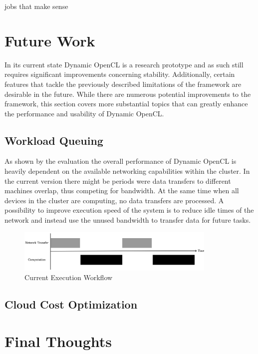 jobs that make sense


\section{Future Work}

In its current state Dynamic OpenCL is a research prototype and as such still requires significant improvements concerning stability. Additionally, certain features that tackle the previously described limitations of the framework are desirable in the future. While there are numerous potential improvements to the framework, this section covers more substantial topics that can greatly enhance the performance and usability of Dynamic OpenCL.

\subsection{Workload Queuing}

As shown by the evaluation the overall performance of Dynamic OpenCL is heavily dependent on the available networking capabilities within the cluster. In the current version there might be periods were data transfers to different machines overlap, thus competing for bandwidth. At the same time when all devices in the cluster are computing, no data transfers are processed. A possibility to improve execution speed of the system is to reduce idle times of the network and instead use the unused bandwidth to transfer data for future tasks.

\begin{figure}[H]	
	\includegraphics[width=0.85\textwidth]{images/missing_queuing.png}
	\centering
	\caption{Current Execution Workflow}
	\label{img:missing_queuing}
\end{figure}

\subsection{Cloud Cost Optimization}

\section{Final Thoughts}

